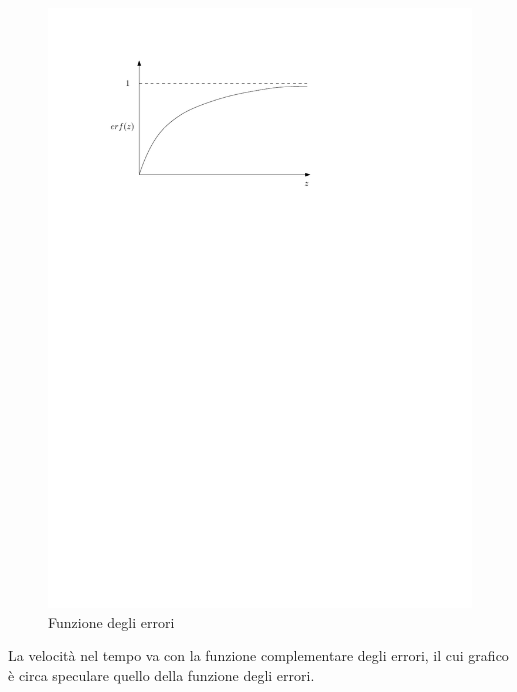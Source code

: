 	\begin{figure}[ht]
		\includegraphics[scale=0.9]{./3.6 Soluzioni esatte equazioni di Navier-Stokes/3.6-11}
		\centering
		\caption{Funzione degli errori}
	\end{figure}
%
La velocità nel tempo va con la funzione complementare degli errori, il cui grafico è circa speculare quello della funzione degli errori.
